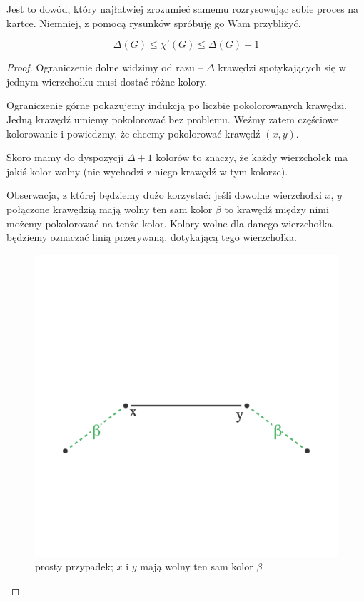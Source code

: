     Jest to dowód, który najłatwiej zrozumieć samemu rozrysowując sobie proces na kartce. Niemniej, z pomocą rysunków spróbuję go Wam przybliżyć.
    
    \begin{theorem}[Vizing]
        $$\Delta(G) \leq \chi'(G) \leq \Delta(G) + 1$$
    \end{theorem}
    
    \begin{proof}
        Ograniczenie dolne widzimy od razu -- $\Delta$ krawędzi spotykających się w jednym wierzchołku musi dostać różne kolory. 
        
        Ograniczenie górne pokazujemy indukcją po liczbie pokolorowanych krawędzi. Jedną krawędź umiemy pokolorować bez problemu.
        Weźmy zatem częściowe kolorowanie i powiedzmy, że chcemy pokolorować krawędź $(x, y)$.
        
        Skoro mamy do dyspozycji $\Delta + 1$ kolorów to znaczy, że każdy wierzchołek ma jakiś kolor wolny (nie wychodzi z niego krawędź w tym kolorze). 
        
        Obserwacja, z której będziemy dużo korzystać: jeśli dowolne wierzchołki $x$, $y$ połączone krawędzią mają wolny ten sam kolor $\beta$
        to krawędź między nimi możemy pokolorować na tenże kolor. Kolory wolne dla danego wierzchołka będziemy oznaczać linią przerywaną. dotykającą tego wierzchołka.
        
        \begin{figure}[ht]
            \centering
            \includegraphics[scale=0.6]{chapters/dyskretna/colours/vizing/images/trivial_case.png}
            \caption{prosty przypadek; $x$ i $y$ mają wolny ten sam kolor $\beta$}
        \end{figure}
        

\end{proof}
